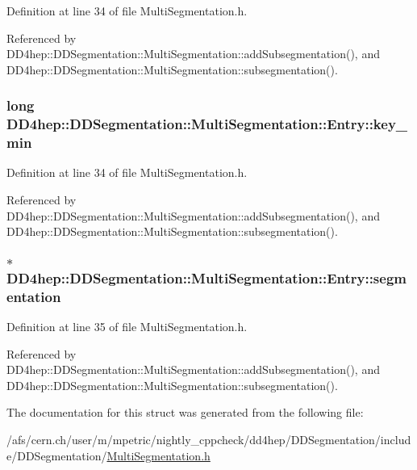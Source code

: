 Definition at line 34 of file MultiSegmentation.h.

Referenced by DD4hep::DDSegmentation::MultiSegmentation::addSubsegmentation(), and DD4hep::DDSegmentation::MultiSegmentation::subsegmentation().\hypertarget{struct_d_d4hep_1_1_d_d_segmentation_1_1_multi_segmentation_1_1_entry_a45ab402e1cc51a736d358270935ce0b1}{
\subsubsection[{key\_\-min}]{\setlength{\rightskip}{0pt plus 5cm}long {\bf DD4hep::DDSegmentation::MultiSegmentation::Entry::key\_\-min}}}
\label{struct_d_d4hep_1_1_d_d_segmentation_1_1_multi_segmentation_1_1_entry_a45ab402e1cc51a736d358270935ce0b1}


Definition at line 34 of file MultiSegmentation.h.

Referenced by DD4hep::DDSegmentation::MultiSegmentation::addSubsegmentation(), and DD4hep::DDSegmentation::MultiSegmentation::subsegmentation().\hypertarget{struct_d_d4hep_1_1_d_d_segmentation_1_1_multi_segmentation_1_1_entry_a1850766ca41dccd7dfdc11806d4eef34}{
\subsubsection[{segmentation}]{$\ast$ {\bf DD4hep::DDSegmentation::MultiSegmentation::Entry::segmentation}}}
\label{struct_d_d4hep_1_1_d_d_segmentation_1_1_multi_segmentation_1_1_entry_a1850766ca41dccd7dfdc11806d4eef34}


Definition at line 35 of file MultiSegmentation.h.

Referenced by DD4hep::DDSegmentation::MultiSegmentation::addSubsegmentation(), and DD4hep::DDSegmentation::MultiSegmentation::subsegmentation().

The documentation for this struct was generated from the following file:\begin{DoxyCompactItemize}
\item 
/afs/cern.ch/user/m/mpetric/nightly\_\-cppcheck/dd4hep/DDSegmentation/include/DDSegmentation/\hyperlink{_d_d_segmentation_2include_2_d_d_segmentation_2_multi_segmentation_8h}{MultiSegmentation.h}\end{DoxyCompactItemize}
